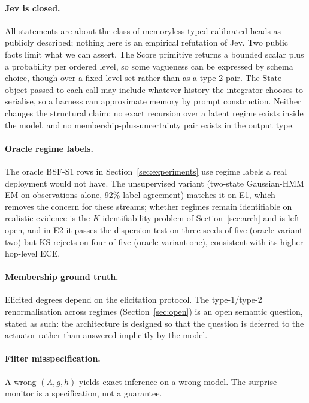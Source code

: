 \documentclass[11pt,a4paper]{article}
\numberwithin{equation}{section}
\theoremstyle{plain}
\theoremstyle{definition}
\theoremstyle{remark}
\begin{document}
\paragraph{Jev is closed.} All statements are about the class of memoryless typed calibrated heads as publicly described; nothing here is an empirical refutation of Jev. Two public facts limit what we can assert. The Score primitive returns a bounded scalar plus a probability per ordered level, so some vagueness can be expressed by schema choice, though over a fixed level set rather than as a type-2 pair. The State object passed to each call may include whatever history the integrator chooses to serialise, so a harness can approximate memory by prompt construction. Neither changes the structural claim: no exact recursion over a latent regime exists inside the model, and no membership-plus-uncertainty pair exists in the output type.

\paragraph{Oracle regime labels.} The oracle BSF-S1 rows in Section~\ref{sec:experiments} use regime labels a real deployment would not have. The unsupervised variant (two-state Gaussian-HMM EM on observations alone, 92\% label agreement) matches it on E1, which removes the concern for these streams; whether regimes remain identifiable on realistic evidence is the $K$-identifiability problem of Section~\ref{sec:arch} and is left open, and in E2 it passes the dispersion test on three seeds of five (oracle variant two) but KS rejects on four of five (oracle variant one), consistent with its higher hop-level ECE.

\paragraph{Membership ground truth.} Elicited degrees depend on the elicitation protocol. The type-1/type-2 renormalisation across regimes (Section~\ref{sec:open}) is an open semantic question, stated as such: the architecture is designed so that the question is deferred to the actuator rather than answered implicitly by the model.

\paragraph{Filter misspecification.} A wrong $(A,g,h)$ yields exact inference on a wrong model. The surprise monitor is a specification, not a guarantee.
\end{document}
